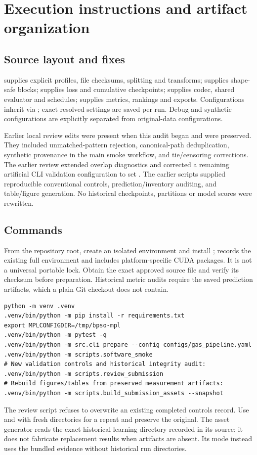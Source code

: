 \documentclass[11pt,a4paper]{report}
\begin{document}
\chapter{Execution instructions and artifact organization}
\section{Source layout and fixes}
 supplies explicit profiles, file checksums, splitting and transforms;  supplies shape-safe blocks;  supplies loss and cumulative checkpoints;  supplies codec, shared evaluator and schedules;  supplies metrics, rankings and exports. Configurations inherit via ; exact resolved settings are saved per run. Debug and synthetic configurations are explicitly separated from original-data configurations.

Earlier local review edits were present when this audit began and were preserved. They included unmatched-pattern rejection, canonical-path deduplication, synthetic provenance in the main smoke workflow, and tie/censoring corrections. The earlier review extended overlap diagnostics and corrected a remaining artificial CLI validation configuration to set . The earlier scripts supplied reproducible conventional controls, prediction/inventory auditing, and table/figure generation. No historical checkpoints, partitions or model scores were rewritten.

\section{Commands}
From the repository root, create an isolated environment and install ;  records the existing full environment and includes platform-specific CUDA packages. It is not a universal portable lock. Obtain the exact approved source file and verify its checksum before preparation. Historical metric audits require the saved prediction artifacts, which a plain Git checkout does not contain.
\begin{lstlisting}
python -m venv .venv
.venv/bin/python -m pip install -r requirements.txt
export MPLCONFIGDIR=/tmp/bpso-mpl
.venv/bin/python -m pytest -q
.venv/bin/python -m src.cli prepare --config configs/gas_pipeline.yaml
.venv/bin/python -m scripts.software_smoke
# New validation controls and historical integrity audit:
.venv/bin/python -m scripts.review_submission
# Rebuild figures/tables from preserved measurement artifacts:
.venv/bin/python -m scripts.build_submission_assets --snapshot
\end{lstlisting}
The review script refuses to overwrite an existing completed controls record. Use  and  with fresh directories for a repeat and preserve the original. The asset generator reads the exact historical learning directory recorded in its source; it does not fabricate replacement results when artifacts are absent. Its  mode instead uses the bundled evidence without historical run directories.
\end{document}
